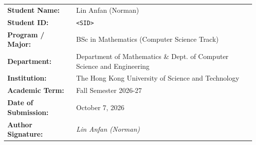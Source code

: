 \documentclass[11pt,a4paper]{article}
\begin{document}
\vspace{1.5cm}
\noindent\begin{tabular}{@{}ll@{}}
\textbf{Student Name:} & Lin Anfan (Norman) \\
\textbf{Student ID:} & \texttt{<SID>} \\
\textbf{Program / Major:} & BSc in Mathematics (Computer Science Track) \\
\textbf{Department:} & Department of Mathematics \& Dept. of Computer Science and Engineering \\
\textbf{Institution:} & The Hong Kong University of Science and Technology \\
\textbf{Academic Term:} & Fall Semester 2026-27 \\
\textbf{Date of Submission:} & October 7, 2026 \\
\textbf{Author Signature:} & \textit{Lin Anfan (Norman)} \\
\end{tabular}
\end{document}
